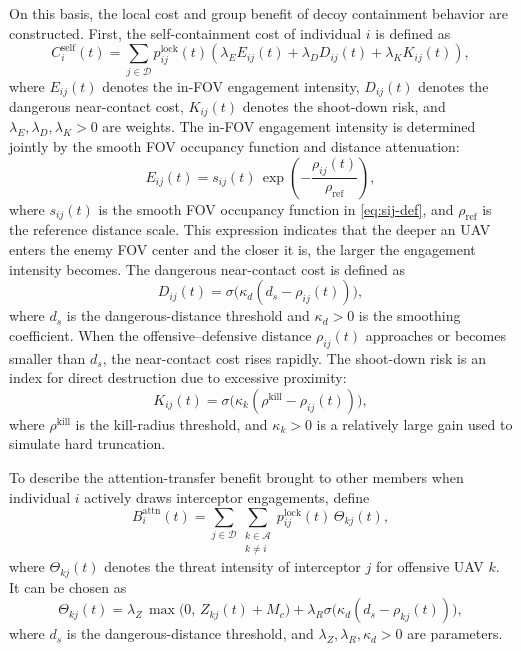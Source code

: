 \documentclass{cja}
\begin{document}
On this basis, the local cost and group benefit of decoy containment behavior are constructed. First, the self-containment cost of individual $i$ is defined as
\begin{equation}
C_i^{\mathrm{self}}(t)
=
\sum_{j\in\mathcal{D}}
p_{ij}^{\mathrm{lock}}(t)
\left(
\lambda_E E_{ij}(t)
+
\lambda_D D_{ij}(t)
+
\lambda_K K_{ij}(t)
\right),
\end{equation}
where $E_{ij}(t)$ denotes the in-FOV engagement intensity, $D_{ij}(t)$ denotes the dangerous near-contact cost, $K_{ij}(t)$ denotes the shoot-down risk, and $\lambda_E,\lambda_D,\lambda_K>0$ are weights.
The in-FOV engagement intensity is determined jointly by the smooth FOV occupancy function and distance attenuation:
\begin{equation}
E_{ij}(t)
=
s_{ij}(t)\,\exp\!\left(-\frac{\rho_{ij}(t)}{\rho_{\mathrm{ref}}}\right),
\end{equation}
where $s_{ij}(t)$ is the smooth FOV occupancy function in \eqref{eq:sij-def}, and $\rho_{\mathrm{ref}}$ is the reference distance scale. This expression indicates that the deeper an UAV enters the enemy FOV center and the closer it is, the larger the engagement intensity becomes.
The dangerous near-contact cost is defined as
\begin{equation}
D_{ij}(t)
=
\sigma\!\bigl(\kappa_d(d_s-\rho_{ij}(t))\bigr),
\end{equation}
where $d_s$ is the dangerous-distance threshold and $\kappa_d>0$ is the smoothing coefficient. When the offensive--defensive distance $\rho_{ij}(t)$ approaches or becomes smaller than $d_s$, the near-contact cost rises rapidly.
The shoot-down risk is an index for direct destruction due to excessive proximity:
\begin{equation}
K_{ij}(t)
=
\sigma\!\bigl(\kappa_k(\rho^{\mathrm{kill}}-\rho_{ij}(t))\bigr),
\end{equation}
where $\rho^{\mathrm{kill}}$ is the kill-radius threshold, and $\kappa_k>0$ is a relatively large gain used to simulate hard truncation.

To describe the attention-transfer benefit brought to other members when individual $i$ actively draws interceptor engagements, define
\begin{equation}
B_i^{\mathrm{attn}}(t)
=
\sum_{j\in\mathcal{D}}
\sum_{\substack{k\in\mathcal{A}\\k\neq i}}
p_{ij}^{\mathrm{lock}}(t)\,\Theta_{kj}(t),
\end{equation}
where $\Theta_{kj}(t)$ denotes the threat intensity of interceptor $j$ for offensive UAV $k$. It can be chosen as
\begin{equation}
\Theta_{kj}(t)
=
\lambda_Z\,\max\bigl(0,\, Z_{kj}(t)+M_c\bigr)
+
\lambda_R \sigma\!\bigl(\kappa_d(d_s-\rho_{kj}(t))\bigr),
\end{equation}
where $d_s$ is the dangerous-distance threshold, and $\lambda_Z,\lambda_R,\kappa_d>0$ are parameters.
\end{document}
